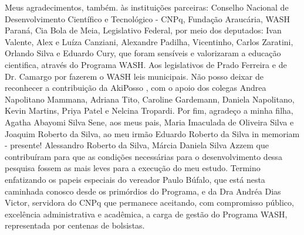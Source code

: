 \begin{agradecimentos}
Meus agradecimentos, também. às instituições parceiras: Conselho Nacional de Desenvolvimento Científico e Tecnológico - CNPq, Fundação Araucária, WASH Paraná, Cia Bola de Meia, Legislativo Federal, por meio dos deputados: Ivan Valente, Alex e Luíza Canziani, Alexandre Padilha, Vicentinho, Carlos Zaratini, Orlando Silva e Eduardo Cury, que foram sensíveis e valorizaram a educação cientifica, através do Programa WASH. Aos legislativos de Prado Ferreira e  de Dr. Camargo por fazerem o WASH leis municipais. Não posso deixar de reconhecer a contribuição da AkiPosso , com o apoio dos colegas  Andrea Napolitano Mammana, Adriana Tito, Caroline Gardemann, Daniela Napolitano, Kevin Martins, Priya Patel e Nelcina Tropardi. Por fim, agradeço a minha filha, Agatha Abayomi Silva Sene, aos meus pais, Maria Imaculada de Oliveira Silva e Joaquim Roberto da Silva, ao meu irmão Eduardo Roberto da Silva in memoriam - presente! Alessandro Roberto da Silva, Márcia Daniela Silva Azzem que contribuíram para que as condições necessárias para o desenvolvimento dessa pesquisa fossem as mais leves para a execução do meu estudo.
Termino enfatizando os papeis especiais do vereador Paulo Búfalo, que está nesta caminhada conosco desde os primórdios do Programa, e da Dra Andréa Dias Victor, servidora do CNPq que permanece aceitando, com compromisso público, excelência administrativa e acadêmica, a carga de gestão do Programa WASH, representada por centenas de bolsistas.

\end{agradecimentos}
